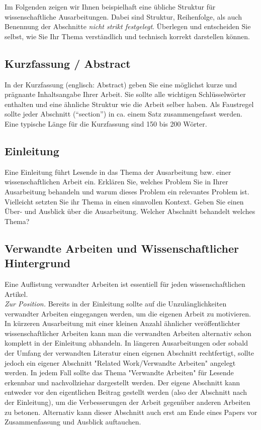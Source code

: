 Im Folgenden zeigen wir Ihnen beispielhaft eine übliche Struktur für wissenschaftliche
Ausarbeitungen. Dabei sind Struktur, Reihenfolge, als auch Benennung der Abschnitte \emph{nicht
  strikt festgelegt}. Überlegen und entscheiden Sie selbst, wie Sie Ihr Thema verständlich und
technisch korrekt darstellen können.

\subsection{Kurzfassung / Abstract}
In der Kurzfassung (englisch: Abstract) geben Sie eine möglichst kurze und prägnante Inhaltsangabe
Ihrer Arbeit.
Sie sollte alle wichtigen Schlüsselwörter enthalten und eine ähnliche Struktur wie die Arbeit selber
haben.
Als Faustregel sollte jeder Abschnitt (``section'') in ca. einem Satz zusammengefasst werden.
Eine typische Länge für die Kurzfassung sind 150 bis 200 Wörter.

\subsection{Einleitung}
Eine Einleitung führt Lesende in das Thema der Ausarbeitung bzw. einer wissenschaftlichen Arbeit
ein. Erklären Sie, welches Problem Sie in Ihrer Ausarbeitung behandeln und warum dieses Problem ein
relevantes Problem ist. Vielleicht setzten Sie ihr Thema in einen sinnvollen Kontext. Geben Sie
einen Über- und Ausblick über die Ausarbeitung. Welcher Abschnitt behandelt welches Thema?

\subsection{Verwandte Arbeiten und Wissenschaftlicher Hintergrund}

Eine Auflistung verwandter Arbeiten ist essentiell für jeden wissenschaftlichen Artikel.\\

\noindent
\emph{Zur Position.}
Bereits in der Einleitung sollte auf die Unzulänglichkeiten verwandter Arbeiten eingegangen werden,
um die eigenen Arbeit zu motivieren.
In kürzeren Ausarbeitung mit einer kleinen Anzahl ähnlicher veröffentlichter wissenschaftlicher
Arbeiten kann man die verwandten Arbeiten alternativ schon komplett in der Einleitung abhandeln.
In längeren Ausarbeitungen oder sobald der Umfang der verwandten Literatur einen eigenen Abschnitt
rechtfertigt, sollte jedoch ein eigener Abschnitt "Related Work/Verwandte Arbeiten" angelegt werden.
In jedem Fall sollte das Thema "Verwandte Arbeiten" für Lesende erkennbar und nachvollziehar
dargestellt werden.
Der eigene Abschnitt kann entweder vor den eigentlichen Beitrag gestellt werden (also der Abschnitt
nach der Einleitung), um die Verbesserungen der Arbeit gegenüber anderen Arbeiten zu betonen.
Alternativ kann dieser Abschnitt auch erst am Ende eines Papers vor Zusammenfassung und Ausblick
auftauchen.\\

